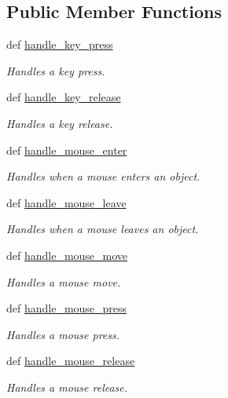 \subsection*{Public Member Functions}
\begin{DoxyCompactItemize}
\item 
def \hyperlink{classcs110graphics_1_1EventHandler_af3fb3531d0b23f1430a830586cd07906}{handle\_\-key\_\-press}
\begin{DoxyCompactList}\small\item\em Handles a key press. \item\end{DoxyCompactList}\item 
def \hyperlink{classcs110graphics_1_1EventHandler_a2849f60251baa44252992162521f2473}{handle\_\-key\_\-release}
\begin{DoxyCompactList}\small\item\em Handles a key release. \item\end{DoxyCompactList}\item 
def \hyperlink{classcs110graphics_1_1EventHandler_a13af3268f8a1aa36b8483eb2deffef15}{handle\_\-mouse\_\-enter}
\begin{DoxyCompactList}\small\item\em Handles when a mouse enters an object. \item\end{DoxyCompactList}\item 
def \hyperlink{classcs110graphics_1_1EventHandler_a5deaf2b6b8055e97ac0ddf6603132c64}{handle\_\-mouse\_\-leave}
\begin{DoxyCompactList}\small\item\em Handles when a mouse leaves an object. \item\end{DoxyCompactList}\item 
def \hyperlink{classcs110graphics_1_1EventHandler_a521fdcd170d15c0b8baa124c78b6d1ef}{handle\_\-mouse\_\-move}
\begin{DoxyCompactList}\small\item\em Handles a mouse move. \item\end{DoxyCompactList}\item 
def \hyperlink{classcs110graphics_1_1EventHandler_a547873123ebcd3fcc63a2e03d2a2fee3}{handle\_\-mouse\_\-press}
\begin{DoxyCompactList}\small\item\em Handles a mouse press. \item\end{DoxyCompactList}\item 
def \hyperlink{classcs110graphics_1_1EventHandler_a320a7dbf68d37e0101b237bff1713088}{handle\_\-mouse\_\-release}
\begin{DoxyCompactList}\small\item\em Handles a mouse release. \item\end{DoxyCompactList}\end{DoxyCompactItemize}


